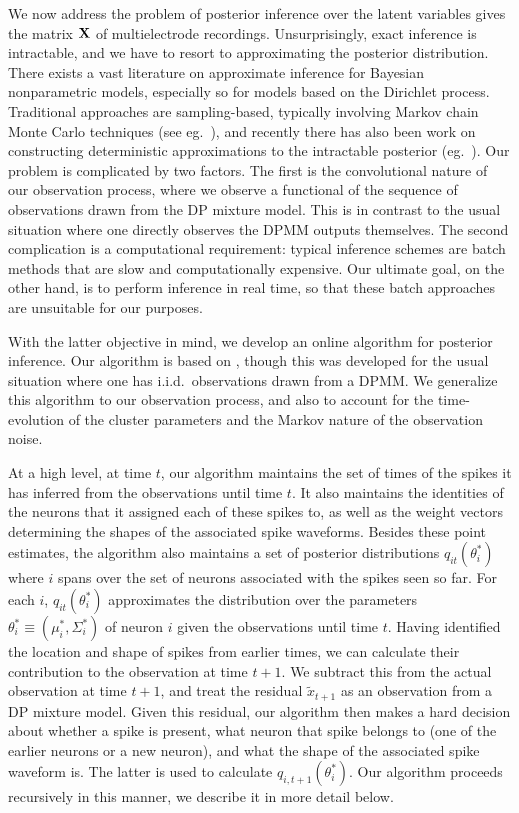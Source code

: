 \newcommand{\tx}{\tilde{x}}

We now address the problem of posterior inference over the latent variables gives the matrix $\mathbf{X}$ of multielectrode recordings. Unsurprisingly, exact 
inference is intractable, and we have to resort to approximating the posterior distribution.
There exists a vast literature on approximate inference for Bayesian nonparametric models, especially so for models based on the Dirichlet process.
Traditional approaches are sampling-based, typically involving Markov chain Monte Carlo techniques (see eg.\ \citep{Nea2000, IshJam2001}), 
and recently there has also been work on constructing deterministic approximations to the intractable posterior (eg.\ \citep{BleJor2006, MinGha2003}).
Our problem is complicated by two factors. The first is the convolutional nature of our observation process, where we observe a functional of the 
sequence of observations drawn from the DP mixture model. This is in contrast to the usual situation where one directly observes the DPMM outputs themselves.
The second complication is a computational requirement: typical inference schemes are batch methods that are slow and computationally expensive. 
Our ultimate goal, on the other hand, is to perform inference in real time, so that these batch approaches are unsuitable for our purposes.

With the latter objective in mind, we develop an online algorithm for posterior inference. Our algorithm is based on \cite{WangDun2009}, though this was 
developed for the usual situation where one has i.i.d.\ observations drawn from a DPMM. We generalize this algorithm to our observation process, and also 
to account for the time-evolution of the cluster parameters and the Markov nature of the observation noise.

At a high level, at time $t$, our algorithm maintains the set of times of the spikes it has inferred from the observations until time $t$. It also maintains
the identities of the neurons that it assigned each of these spikes to, as well as the weight vectors determining the shapes of the associated spike 
waveforms. Besides these point estimates, the algorithm also maintains a set of posterior distributions $q_{it}(\theta^*_i)$ where $i$ spans over the
set of neurons associated with the spikes seen so far. For each $i$, $q_{it}(\theta^*_i)$ approximates the distribution over the parameters 
$\theta_i^* \equiv (\mu_i^*, \Sigma_i^*)$ of neuron $i$ given the observations until time $t$. 
Having identified the location and shape of spikes from earlier times, we can calculate their contribution to the observation at time $t+1$.
We subtract this from the actual observation at time $t+1$, and treat the residual $\tx_{t+1}$ as an observation from a DP mixture model.
Given this residual, our algorithm then makes a hard decision about whether a spike is present, what neuron that spike belongs to 
(one of the earlier neurons or a new neuron), and what the shape of the associated spike waveform is. The latter is used to calculate
$q_{i,t+1}(\theta^*_i)$. Our algorithm proceeds recursively in this manner, we describe it in more detail below.


